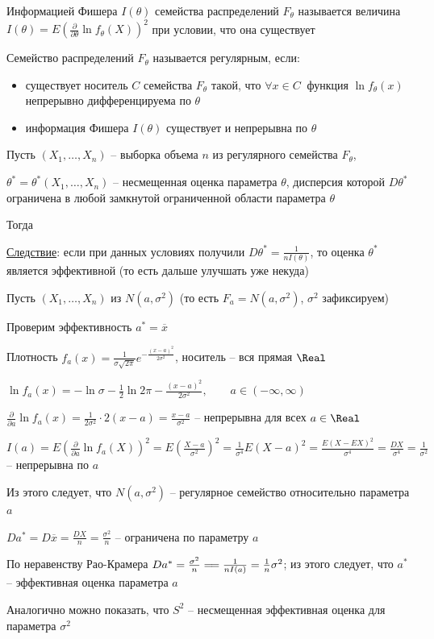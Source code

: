 \Def Информацией Фишера $I(\theta)$ семейства распределений $F_\theta$ называется величина 
$I(\theta) = E\left(\frac{\partial}{\partial \theta} \ln f_\theta(X)\right)^2$ при условии, что
она существует

\Def Семейство распределений $F_\theta$ называется регулярным, если:

\begin{itemize}
    \item существует носитель $C$ семейства $F_\theta$ такой, что $\forall x \in C \ $ функция $\ln f_\theta(x)$ непрерывно дифференцируема по $\theta$
    \item информация Фишера $I(\theta)$ существует и непрерывна по $\theta$
\end{itemize}

\hypertarget{rao_kramer_inequality}{}

\begin{MyTheorem}
    \Ths Пусть $(X_1, \dots, X_n)$ -- выборка объема $n$ из регулярного семейства $F_\theta$,

    $\theta^* = \theta^*(X_1, \dots, X_n)$ -- несмещенная оценка параметра $\theta$, дисперсия которой
    $D\theta^*$ ограничена в любой замкнутой ограниченной области параметра $\theta$

    Тогда 
\end{MyTheorem}

\underline{Следствие}: если при данных условиях получили $D\theta^* = \frac{1}{n I(\theta)}$, то оценка $\theta^*$ является эффективной 
(то есть дальше улучшать уже некуда)

\Ex Пусть $(X_1, \dots, X_n)$ из $N(a, \sigma^2)$ (то есть $F_a = N(a, \sigma^2)$, $\sigma^2$ зафиксируем)

Проверим эффективность $a^* = \overline{x}$

Плотность $f_a(x) = \frac{1}{\sigma \sqrt{2\pi}} e^{-\frac{(x - a)^2}{2\sigma^2}}$, носитель -- вся прямая $\Real$

$\ln f_a(x) = -\ln \sigma - \frac{1}{2} \ln 2\pi - \frac{(x - a)^2}{2\sigma^2}, \quad\quad a \in (-\infty, \infty)$

$\frac{\partial}{\partial a} \ln f_a(x) = \frac{1}{2\sigma^2} \cdot 2(x - a) = \frac{x - a}{\sigma^2}$ -- непрерывна для всех $a \in \Real$

$I(a) = E\left(\frac{\partial}{\partial a} \ln f_a(X)\right)^2 = E\left(\frac{X - a}{\sigma^2}\right)^2 = \frac{1}{\sigma^4} E(X - a)^2 = \frac{E(X - EX)^2}{\sigma^4} = 
\frac{DX}{\sigma^4} = \frac{1}{\sigma^2}$ -- непрерывна по $a$

Из этого следует, что $N(a, \sigma^2)$ -- регулярное семейство относительно параметра $a$

$Da^* = D\overline{x} = \frac{DX}{n} = \frac{\sigma^2}{n}$ -- ограничена по параметру $a$

По неравенству Рао-Крамера $Da^* = \frac{\sigma^2}{n} =\joinrel= \frac{1}{nI(a)} = \frac{1}{n} \sigma^2$; из 
этого следует, что $a^*$ -- эффективная оценка параметра $a$

\Nota Аналогично можно показать, что $S^2$ -- несмещенная эффективная оценка для параметра $\sigma^2$



